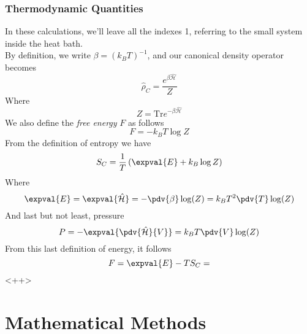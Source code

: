 \documentclass[a4paper, 11pt]{book}
\renewcommand{\trace}{\mathrm{Tr}}
\newcommand{\1}{\opr{\mathds{1}}}
\newcommand{\ham}{\mathcal{H}}
\newcommand{\opr}[1]{\hat{#1}}
\newcommand{\dopr}{\hat{\rho}}
\theoremstyle{plain}
\begin{document}
		\subsection{Thermodynamic Quantities}
		In these calculations, we'll leave all the indexes 1, referring to the small system inside the heat bath.\\
		By definition, we write $\beta=(k_BT)^{-1}$, and our canonical density operator becomes
		\begin{equation}
			\dopr_C=\frac{e^{\beta\opr{\ham}}}{Z}
			\label{eq:canonicalmatrix}
		\end{equation}
		Where
		\begin{equation}
			Z=\trace e^{-\beta\opr{\ham}}
			\label{eq:partitionfunctioncanonicalthermodynamics}
		\end{equation}
		We also define the \textit{free energy} $F$ as follows
		\begin{equation}
			F=-k_BT\log Z
			\label{eq:freeenergy}
		\end{equation}
		From the definition of entropy we have
		\begin{equation}
			S_C=\frac{1}{T}\left( \expval{E}+k_B\log Z \right)
			\label{eq:entropy}
		\end{equation}
		Where
		\begin{equation}
			\expval{E}=\expval{\opr{\ham}}=-\pdv{\beta}\log(Z)=k_BT^2\pdv{T}\log(Z)
			\label{eq:energyaverage}
		\end{equation}
		And last but not least, pressure
		\begin{equation}
			P=-\expval{\pdv{\opr{\ham}}{V}}=k_BT\pdv{V}\log(Z)
			\label{eq:pressurecanonical}
		\end{equation}
		From this last definition of energy, it follows
		\begin{equation}
			F=\expval{E}-TS_C=
			\label{eq:freeenergy2}
		\end{equation}
		<++>
	\appendix
	\chapter{Mathematical Methods}
\end{document}
